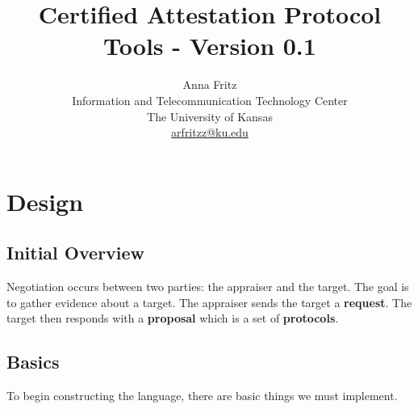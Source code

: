 \documentclass[10pt]{report}
\title{Certified Attestation Protocol Tools - Version 0.1}
\author{Anna Fritz \\
  Information and Telecommunication Technology Center \\
  The University of Kansas \\
  \url{arfritzz@ku.edu}
}
\begin{document}
\chapter {Design}

\section {Initial Overview}

Negotiation occurs between two parties: the appraiser and the target.
The goal is to gather evidence about a target. The appraiser sends the
target a \textbf{request}. The target then responds
with a \textbf{proposal} which is a set of \textbf{protocols}.

\section {Basics}

To begin constructing the language, there are basic things we must implement. 
\end{document}
